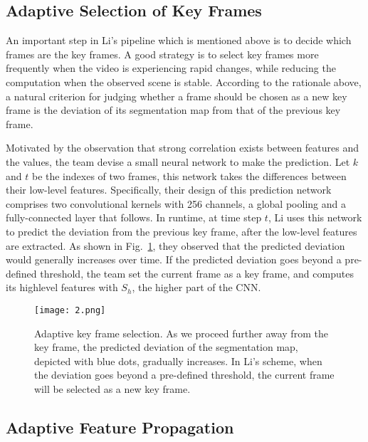 \documentclass[10pt,twocolumn,letterpaper]{article}
\begin{document}
\subsection{Adaptive Selection of Key Frames}

An important step in Li's pipeline which is mentioned above is to decide which frames are the key frames. A good strategy is to select key frames more frequently when the video is experiencing rapid changes, while reducing the computation when the observed scene is stable. According to the rationale above, a natural criterion for judging whether a frame should be chosen as a new key frame is the deviation of its segmentation map from that of the previous key frame.

Motivated by the observation that strong correlation exists between features and the values, the team devise a small neural network to make the prediction. Let $k$ and $t$ be the indexes of two frames, this network takes the differences between their low-level features. Specifically, their design of this prediction network comprises two convolutional kernels with 256 channels, a global pooling and a fully-connected layer that follows. In runtime, at time step $t$, Li uses this network to predict the deviation from the previous key frame, after the low-level features are extracted. As shown in Fig.~\ref{fig:2}, they observed that the predicted deviation would generally increases over time. If the predicted deviation goes beyond a pre-defined threshold, the team set the current frame as a key frame, and computes its highlevel features with $S_h$, the higher part of the CNN.
\begin{figure}
	\begin{center}
		\texttt{[image: 2.png]}
	\end{center}
	\caption{Adaptive key frame selection. As we proceed further away from the key frame, the predicted deviation of the segmentation map, depicted with blue dots, gradually increases. In Li's scheme, when the deviation goes beyond a pre-defined threshold, the current frame will be selected as a new key frame.}
	\label{fig:2}
\end{figure}

\subsection{Adaptive Feature Propagation}
\end{document}
